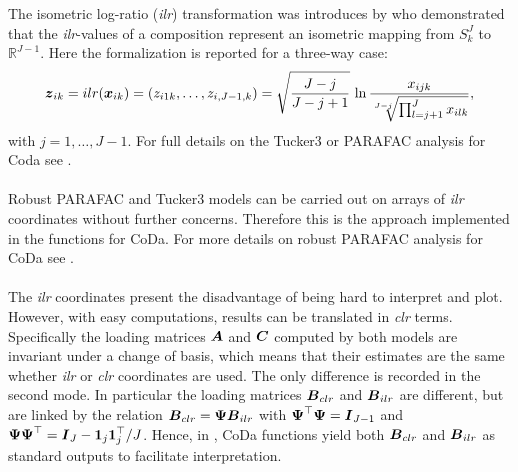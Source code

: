 \documentclass[article,shortnames, nojss]{jss}
\newcommand{\vv}[1]{\mbox{\boldmath$#1$}}
\begin{document}
The isometric log-ratio (\textit{ilr}) transformation was introduces by \citet{Ego03} who demonstrated that the \textit{ilr}-values of a composition represent an isometric mapping from $S_{k}^J$ to
${\mathbb R}^{J-1}$. Here the formalization is reported for a three-way case:
\begin{equation}
\label{ilrtrafo}
\vv{z}_{ik}=ilr(\vv{x}_{ik})=(z_{i1k},\ldots ,z_{i,J-1,k})=
\sqrt{\frac{J-j}{J-j+1}}\,\ln\frac{x_{ijk}}{\sqrt[J-j]{\prod_{l=j+1}^J
x_{ilk}}},
\end{equation}
with $j=1,\dots ,J-1$. For full details on the Tucker3 or PARAFAC analysis
for Coda see \citet{gallo:2015,Engle13}. \\\\
Robust PARAFAC and Tucker3 models can be carried out on arrays of \textit{ilr} coordinates without further concerns. Therefore this is the approach implemented in the  functions for CoDa. For more details on robust PARAFAC analysis for CoDa see \citep{dipalma:2018}.\\\\
The \textit{ilr} coordinates present the disadvantage of being hard to interpret and plot. However, with easy computations, results can be translated in \textit{clr} terms. Specifically the loading matrices $\vv{A}$ and $\vv{C}$ computed by both models are invariant under a change of basis, which means that their estimates are the same whether \textit{ilr} or \textit{clr} coordinates are used. The only difference is recorded in the second mode. In particular the loading matrices $\vv{B}_{clr}$ and $\vv{B}_{ilr}$ are different, but are linked by the relation $\vv{B}_{clr}= \vv{\Psi} \vv{B}_{ilr}$ with $\vv{\Psi}^\top\vv{\Psi}=\vv{I}_{J-1}$ and $\vv{\Psi}\vv{\Psi}^\top=\vv{I}_{J}-\vv{1}_j\vv{1}_j^\top/J$. Hence, in , CoDa functions yield both $\vv{B}_{clr}$ and $\vv{B}_{ilr}$ as standard outputs to facilitate interpretation.
\end{document}
